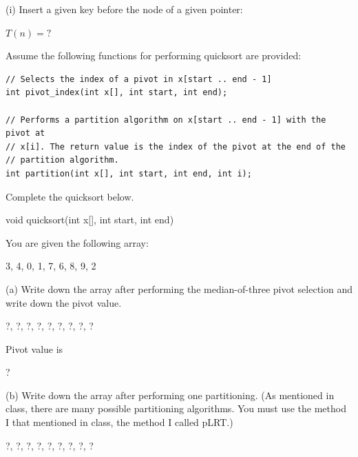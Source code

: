 (i)
Insert a given key before the node of a given pointer:
\\
\ANSWER
\begin{answerlong}
$T(n) = ?$
\end{answerlong}

\newpage
\nextq %
Assume the following functions for performing quicksort are
provided:
\vspace{-2mm}
\begin{Verbatim}[frame=single,fontsize=\small]
// Selects the index of a pivot in x[start .. end - 1]
int pivot_index(int x[], int start, int end);
 
// Performs a partition algorithm on x[start .. end - 1] with the pivot at
// x[i]. The return value is the index of the pivot at the end of the
// partition algorithm. 
int partition(int x[], int start, int end, int i);
\end{Verbatim}
\vspace{-4mm}
Complete the quicksort below.

\ANSWER
\begin{answercode}
void quicksort(int x[], int start, int end)
{ 
 
}
\end{answercode}

\newpage
\nextq %
You are given the following array:
\begin{console}
{3, 4, 0, 1, 7, 6, 8, 9, 2}
\end{console}

(a)
Write down the array after performing the median-of-three
pivot selection and write down the pivot value.
\\
\ANSWER
\begin{answercode}
{?, ?, ?, ?, ?, ?, ?, ?, ?}
\end{answercode}
Pivot value is
\begin{answercode}
?
\end{answercode}


(b)
Write down the array after performing one partitioning.
(As mentioned in class, there are many possible partitioning
algorithms. You must use the method I that mentioned in class,
the method I called pLRT.)
\\
\ANSWER
\begin{answercode}
{?, ?, ?, ?, ?, ?, ?, ?, ?}
\end{answercode}

